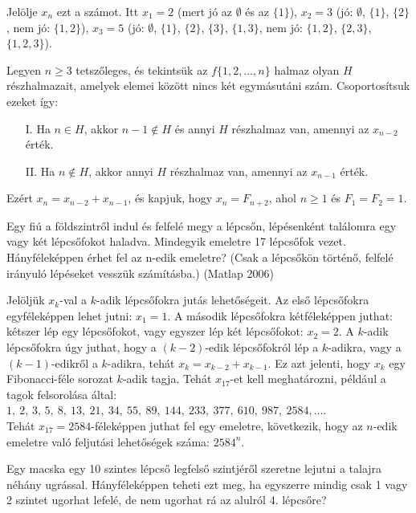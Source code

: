 \begin{solution}
Jelölje $x_{n}$ ezt a számot. Itt $x_{1}=2$ (mert jó az $\emptyset$
és az $\{1\}$), $x_{2}=3$ (jó: $\emptyset$, $\{1\}$, $\{2\}$,
nem jó: $\{1,2\}$), $x_{3}=5$ (jó: $\emptyset$, $\{1\}$, $\{2\}$,
$\{3\}$, $\{1,3\}$, nem jó: $\{1,2\}$, $\{2,3\}$, $\{1,2,3\}$).

Legyen $n\geq3$ tetszőleges, és tekintsük az $f\{1,2,\ldots,n\}$
halmaz olyan $H$ részhalmazait, amelyek elemei között nincs két egymásutáni
szám. Csoportosítsuk ezeket így:
\begin{itemize}
\item[I.] Ha $n\in H$, akkor $n-1\notin H$ és annyi $H$ részhalmaz van,
amennyi az $x_{n-2}$ érték. 
\item[II.] Ha $n\notin H$, akkor annyi $H$ részhalmaz van, amennyi az $x_{n-1}$
érték. 
\end{itemize}
Ezért $x_{n}=x_{n-2}+x_{n-1}$, és kapjuk, hogy $x_{n}=F_{n+2}$,
ahol $n\geq1$ és $F_{1}=F_{2}=1$.
\end{solution}
\begin{extraproblem}
Egy fiú a földszintről indul és felfelé megy a lépcsőn, lépésenként
találomra egy vagy két lépcsőfokot haladva. Mindegyik emeletre 17
lépcsőfok vezet. Hányféleképpen érhet fel az n-edik emeletre? (Csak
a lépcsőkön történő, felfelé irányuló lépéseket vesszük számításba.)
(Matlap 2006) 
\end{extraproblem}

\begin{solution}
Jelöljük $x_{k}$-val a $k$-adik lépcsőfokra jutás lehetőségeit.
Az első lépcsőfokra egyféleképpen lehet jutni: $x_{1}=1$. A második
lépcsőfokra kétféleképpen juthat: kétszer lép egy lépcsőfokot, vagy
egyszer lép két lépcsőfokot: $x_{2}=2$. A $k$-adik lépcsőfokra úgy
juthat, hogy a $(k-2)$-edik lépcsőfokról lép a $k$-adikra, vagy
a $(k-1)$-edikről a $k$-adikra, tehát $x_{k}=x_{k-2}+x_{k-1}$.
Ez azt jelenti, hogy $x_{k}$ egy Fibonacci-féle sorozat $k$-adik
tagja. Tehát $x_{17}$-et kell meghatározni, például a tagok felsorolása
által: $1,\ 2,\,3,\,5,\ 8,\ 13,\ 21,\ 34,\ 55,\ 89,\ 144,\ 233,\ 377,\ 610,\ 987,\ 2584,\dots$.\\
 Tehát $x_{17}=2584$-féleképpen juthat fel egy emeletre, következik,
hogy az $n$-edik emeletre való feljutási lehetőségek száma: $2584^{n}$. 
\end{solution}
\begin{extraproblem}
Egy macska egy 10 szintes lépcső legfelső szintjéről szeretne lejutni
a talajra néhány ugrással. Hányféleképpen teheti ezt meg, ha egyszerre
mindig csak 1 vagy 2 szintet ugorhat lefelé, de nem ugorhat rá az
alulról 4. lépcsőre? 
\end{extraproblem}

